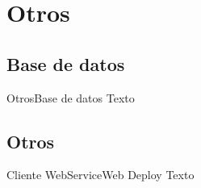 \documentclass[10pt]{beamer}
\begin{document}
\section{Otros}
\subsection{Base de datos}
\begin{frame}{Otros}{Base de datos}
	Texto
\end{frame}
\subsection{Otros}
\begin{frame}{Cliente WebService}{Web Deploy}
	Texto
\end{frame}
\begin{frame}
\end{frame}
\end{document}
